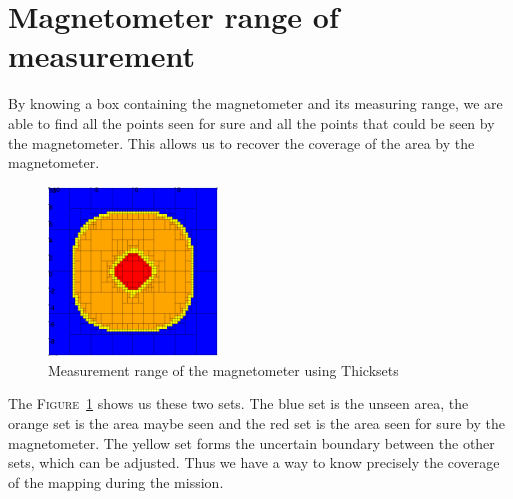 \section*{Magnetometer range of measurement}
    By knowing a box containing the magnetometer and its measuring range, we are able to find all the points seen for sure and all the points that could be seen by the magnetometer. This allows us to recover the coverage of the area by the magnetometer.

    \begin{figure}[!htb]
        \centering
        \includegraphics[width=0.4\textwidth]{imgs/thickset.png}
        \caption{\label{fig:thickset} Measurement range of the magnetometer using Thicksets}
    \end{figure}

    The \textsc{Figure}~\ref{fig:thickset} shows us these two sets. The blue set is the unseen area, the orange set is the area maybe seen and the red set is the area seen for sure by the magnetometer. The yellow set forms the uncertain boundary between the other sets, which can be adjusted. Thus we have a way to know precisely the coverage of the mapping during the mission.